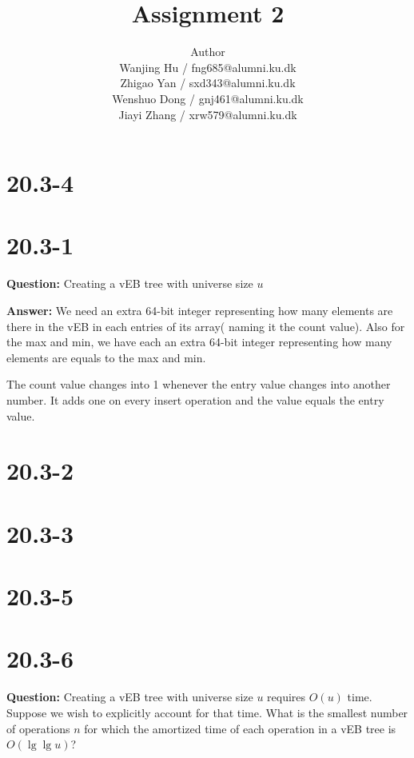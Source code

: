 \documentclass[12pt]{article}
\title{Assignment 2}
\author{Author \\
  Wanjing Hu / fng685@alumni.ku.dk  \\
  Zhigao Yan / sxd343@alumni.ku.dk  \\
  Wenshuo Dong / gnj461@alumni.ku.dk  \\
  Jiayi Zhang / xrw579@alumni.ku.dk \\
}
\begin{document}
\maketitle

\section{20.3-4}

\section{20.3-1}
\textbf{Question: } 
Creating a vEB tree with universe size $u$ 

\textbf{Answer:}
We need an extra 64-bit integer representing how many elements are there in the vEB in each entries of its array( naming it the count value). Also for the max and min, we have each an extra  64-bit integer representing how many elements are equals to the max and min. 

The count value changes into 1 whenever the entry value changes into another number. It adds one on every insert operation and the value equals the entry value.

\section{20.3-2}

\section{20.3-3}

\section{20.3-5}

\section{20.3-6}
\textbf{Question: } 
Creating a vEB tree with universe size $u$ requires $O(u)$ time. Suppose we wish to explicitly account for that time. What is the smallest number of operations $n$ for which the amortized time of each operation in a vEB tree is $O(\lg\lg u)$?
\end{document}

